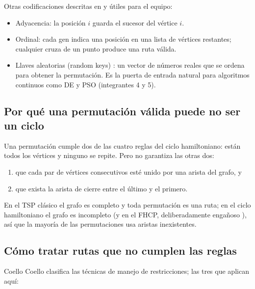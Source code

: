 Otras codificaciones descritas en \cite{aco4} y útiles para el equipo:
\begin{itemize}[nosep]
  \item Adyacencia: la posición $i$ guarda el sucesor del vértice $i$.
  \item Ordinal: cada gen indica una posición en una lista de vértices restantes;
        cualquier cruza de un punto produce una ruta válida.
  \item Llaves aleatorias (random keys) \cite{aco11}: un vector de números reales que
        se ordena para obtener la permutación. Es la puerta de entrada natural para
        algoritmos continuos como DE y PSO (integrantes 4 y 5).
\end{itemize}

\subsection{Por qué una permutación válida puede no ser un ciclo}

Una permutación cumple dos de las cuatro reglas del ciclo hamiltoniano: están todos
los vértices y ninguno se repite. Pero no garantiza las otras dos:
\begin{enumerate}[nosep]
  \item que cada par de vértices consecutivos esté unido por una arista del grafo, y
  \item que exista la arista de cierre entre el último y el primero.
\end{enumerate}
En el TSP clásico el grafo es completo y toda permutación es una ruta; en el ciclo
hamiltoniano el grafo es incompleto (y en el FHCP, deliberadamente engañoso \cite{aco8}), así que la
mayoría de las permutaciones usa aristas inexistentes.

\subsection{Cómo tratar rutas que no cumplen las reglas}

Coello Coello \cite{aco5} clasifica las técnicas de manejo de restricciones; las tres que aplican aquí:

